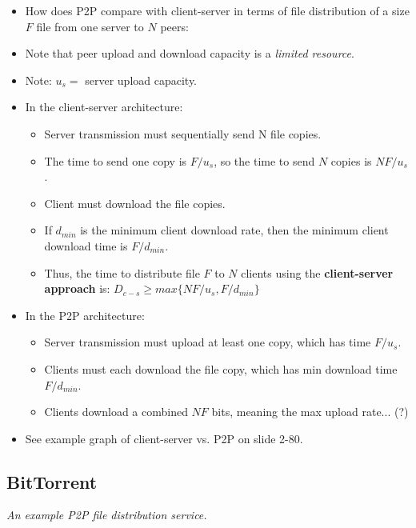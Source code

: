 \documentclass{article}
\begin{document}
\begin{itemize}
\item How does P2P compare with client-server in terms of file distribution of a size $F$ file from one server to $N$ peers:
\item Note that peer upload and download capacity is a \emph{limited resource}.
\item Note: $u_s = $ server upload capacity.
\item In the client-server architecture:
\begin{itemize}
\item Server transmission must sequentially send N file copies.
\item The time to send one copy is $F/u_s$, so the time to send $N$ copies is $NF/u_s$.
\item Client must download the file copies.
\item If $d_{min}$ is the minimum client download rate, then the minimum client download time is $F/d_{min}$.
\item Thus, the time to distribute file $F$ to $N$ clients using the {\bf client-server approach} is: $D_{c-s} \ge max\{NF/u_s,F/d_{min}\}$
\end{itemize}
\item In the P2P architecture:
\begin{itemize}
\item Server transmission must upload at least one copy, which has time $F/u_s$.
\item Clients must each download the file copy, which has min download time $F/d_{min}$.
\item Clients download a combined $NF$ bits, meaning the max upload rate... (?)
\end{itemize}
\item See example graph of client-server vs. P2P on slide 2-80.
\end{itemize}

\clearpage

\subsection{BitTorrent}
\vspace{-3mm}
\emph{An example P2P file distribution service.}
\end{document}
